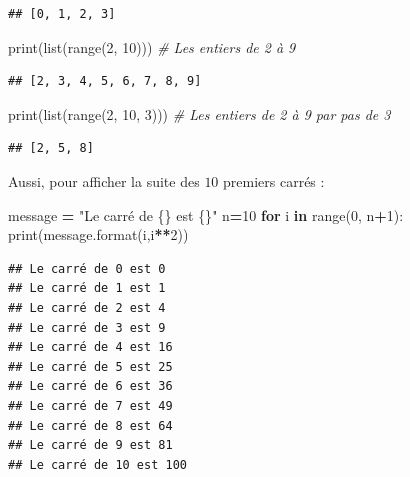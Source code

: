 \documentclass[12pt,]{book}
\newenvironment{Shaded}{\begin{snugshade}}{\end{snugshade}}
\newcommand{\KeywordTok}[1]{\textcolor[rgb]{0.13,0.29,0.53}{\textbf{#1}}}
\newcommand{\DecValTok}[1]{\textcolor[rgb]{0.00,0.00,0.81}{#1}}
\newcommand{\SpecialCharTok}[1]{\textcolor[rgb]{0.00,0.00,0.00}{#1}}
\newcommand{\StringTok}[1]{\textcolor[rgb]{0.31,0.60,0.02}{#1}}
\newcommand{\CommentTok}[1]{\textcolor[rgb]{0.56,0.35,0.01}{\textit{#1}}}
\newcommand{\ControlFlowTok}[1]{\textcolor[rgb]{0.13,0.29,0.53}{\textbf{#1}}}
\newcommand{\OperatorTok}[1]{\textcolor[rgb]{0.81,0.36,0.00}{\textbf{#1}}}
\newcommand{\BuiltInTok}[1]{#1}
\newcommand{\NormalTok}[1]{#1}
\numberwithin{equation}{section}
\numberwithin{countremarque}{section}
\begin{document}
\begin{lstlisting}
## [0, 1, 2, 3]
\end{lstlisting}

\begin{Shaded}
\begin{Highlighting}[]
\BuiltInTok{print}\NormalTok{(}\BuiltInTok{list}\NormalTok{(}\BuiltInTok{range}\NormalTok{(}\DecValTok{2}\NormalTok{, }\DecValTok{10}\NormalTok{))) }\CommentTok{# Les entiers de 2 à 9}
\end{Highlighting}
\end{Shaded}

\begin{lstlisting}
## [2, 3, 4, 5, 6, 7, 8, 9]
\end{lstlisting}

\begin{Shaded}
\begin{Highlighting}[]
\BuiltInTok{print}\NormalTok{(}\BuiltInTok{list}\NormalTok{(}\BuiltInTok{range}\NormalTok{(}\DecValTok{2}\NormalTok{, }\DecValTok{10}\NormalTok{, }\DecValTok{3}\NormalTok{))) }\CommentTok{# Les entiers de 2 à 9 par pas de 3}
\end{Highlighting}
\end{Shaded}

\begin{lstlisting}
## [2, 5, 8]
\end{lstlisting}

Aussi, pour afficher la suite des \(10\) premiers carrés :

\begin{Shaded}
\begin{Highlighting}[]
\NormalTok{message }\OperatorTok{=} \StringTok{"Le carré de }\SpecialCharTok{\{\}}\StringTok{ est }\SpecialCharTok{\{\}}\StringTok{"} 
\NormalTok{n}\OperatorTok{=}\DecValTok{10}
\ControlFlowTok{for}\NormalTok{ i }\KeywordTok{in} \BuiltInTok{range}\NormalTok{(}\DecValTok{0}\NormalTok{, n}\OperatorTok{+}\DecValTok{1}\NormalTok{):}
  \BuiltInTok{print}\NormalTok{(message.}\BuiltInTok{format}\NormalTok{(i,i}\OperatorTok{**}\DecValTok{2}\NormalTok{))}
\end{Highlighting}
\end{Shaded}

\begin{lstlisting}
## Le carré de 0 est 0
## Le carré de 1 est 1
## Le carré de 2 est 4
## Le carré de 3 est 9
## Le carré de 4 est 16
## Le carré de 5 est 25
## Le carré de 6 est 36
## Le carré de 7 est 49
## Le carré de 8 est 64
## Le carré de 9 est 81
## Le carré de 10 est 100
\end{lstlisting}
\end{document}
